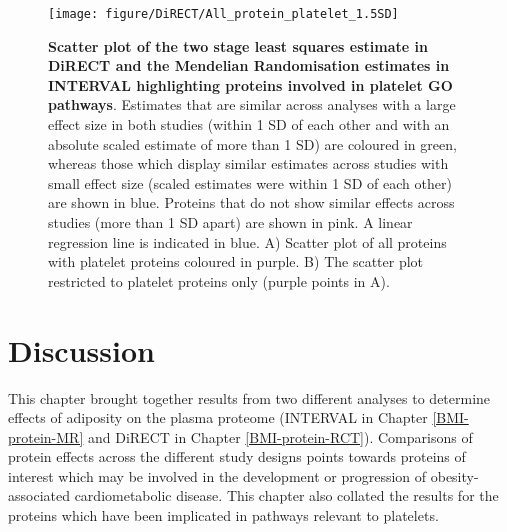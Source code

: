 \documentclass[11pt,twoside]{bristolthesis}
\begin{document}
\begin{figure}

{\centering \texttt{[image: figure/DiRECT/All\_protein\_platelet\_1.5SD]} 

}

\caption[Scatter plot of the two stage least squares estimate in DiRECT and the Mendelian Randomisation estimates in INTERVAL highlighting proteins involved in platelet gene ontology (GO) pathways]{\textbf{Scatter plot of the two stage least squares estimate in DiRECT and the Mendelian Randomisation estimates in INTERVAL highlighting proteins involved in platelet GO pathways}. Estimates that are similar across analyses with a large effect size in both studies (within 1 SD of each other and with an absolute scaled estimate of more than 1 SD) are coloured in green, whereas those which display similar estimates across studies with small effect size (scaled estimates were within 1 SD of each other) are shown in blue. Proteins that do not show similar effects across studies (more than 1 SD apart) are shown in pink. A linear regression line is indicated in blue. A) Scatter plot of all proteins with platelet proteins coloured in purple. B) The scatter plot restricted to platelet proteins only (purple points in A).}\label{fig:DiRECT-INTERVAL-platelet}
\end{figure}
\hypertarget{discussion-5}{%
\section{Discussion}\label{discussion-5}}

This chapter brought together results from two different analyses to determine effects of adiposity on the plasma proteome (INTERVAL in Chapter \ref{BMI-protein-MR} and DiRECT in Chapter \ref{BMI-protein-RCT}). Comparisons of protein effects across the different study designs points towards proteins of interest which may be involved in the development or progression of obesity-associated cardiometabolic disease. This chapter also collated the results for the proteins which have been implicated in pathways relevant to platelets.
\end{document}
